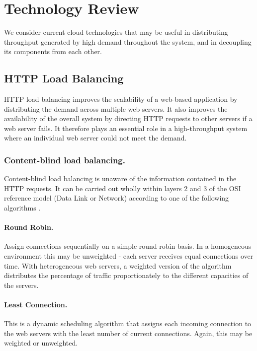 \documentclass{llncs}
\begin{document}
\section{Technology Review}

We consider current cloud technologies that may be useful in distributing throughput generated by high demand throughout the system, and in decoupling its components from each other.

\subsection{HTTP Load Balancing}

HTTP load balancing improves the scalability of a web-based application by distributing the demand across multiple web servers.  It also improves the availability of the overall system by directing HTTP requests to other servers if a web server fails.  It therefore plays an essential role in a high-throughput system where an individual web server could not meet the demand.

\subsubsection{Content-blind load balancing.}  Content-blind load balancing is unaware of the information contained in the HTTP requests.  It can be carried out wholly within layers 2 and 3 of the OSI reference model \cite{day1983osi} (Data Link or Network) according to one of the following algorithms \cite{gilly2011up}.

\paragraph{Round Robin.} Assign connections sequentially on a simple round-robin basis.  In a homogeneous environment this may be unweighted - each server receives equal connections over time.  With heterogeneous web servers, a weighted version of the algorithm distributes the percentage of traffic proportionately to the different capacities of the servers.

\paragraph{Least Connection.}  This is a dynamic scheduling algorithm that assigns each incoming connection to the web servers with the least number of current connections. Again, this may be weighted or unweighted.
\end{document}
